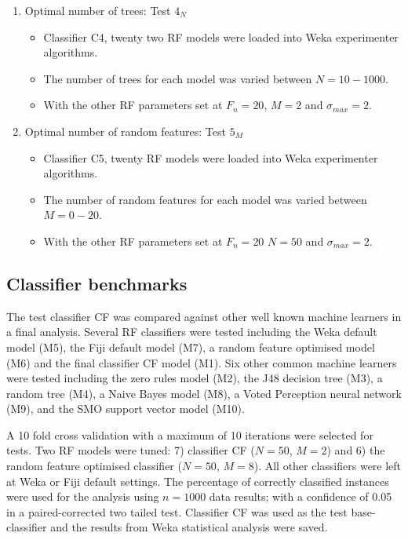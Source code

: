 \begin{enumerate}
\item Optimal number of trees: Test $4_{N}$
	\begin{itemize}
	\item Classifier C4, twenty two \ac{RF} models were loaded into \ac{Weka} experimenter algorithms.
	\item The number of trees for each model was varied between $N = 10-1000$.
	\item With the other \ac{RF} parameters set at $F_n = 20$, $M = 2$ and $\sigma_{max} = 2$. 
	\end{itemize}
\item Optimal number of random features: Test $5_{M}$
	\begin{itemize}
	\item Classifier C5, twenty \ac{RF} models were loaded into \ac{Weka} experimenter algorithms.
	\item The number of random features for each model was varied between $M = 0-20$.
	\item With the other \ac{RF} parameters set at $F_n = 20$ $N = 50$ and $\sigma_{max} = 2$. 
	\end{itemize}
\end{enumerate}

\subsection{Classifier benchmarks}\label{sec:classifier-benchmarks}

The test classifier CF was compared against other well known machine learners in a final analysis. Several \ac{RF} classifiers were tested including the \ac{Weka} default model (M5), the \ac{Fiji} default model (M7),  a random feature optimised model (M6) and the final classifier CF model (M1). Six other common machine learners were tested including the zero rules model (M2), the J48 decision tree (M3), a random tree (M4), a Naive Bayes model (M8), a Voted Perception neural network (M9), and the SMO support vector model (M10).

A 10 fold cross validation with a maximum of 10 iterations were selected for tests. Two \ac{RF} models were tuned: 7) classifier CF ($ N = 50 $, $ M = 2 $) and 6) the random feature optimised classifier ($ N = 50 $, $ M = 8 $). All other classifiers were left at \ac{Weka} or \ac{Fiji} default settings. The percentage of correctly classified instances were used for the analysis using $n = 1000$ data results; with a confidence of 0.05 in a paired-corrected two tailed test. Classifier CF was used as the test base-classifier and the results from \ac{Weka} statistical analysis were saved.

